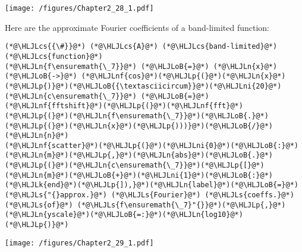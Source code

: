 \documentclass[12pt,a4paper]{article}
\newcommand{\HLJLk}[1]{\textcolor[RGB]{148,91,176}{\textbf{#1}}}
\newcommand{\HLJLn}[1]{#1}
\newcommand{\HLJLnf}[1]{\textcolor[RGB]{66,102,213}{#1}}
\newcommand{\HLJLs}[1]{\textcolor[RGB]{201,61,57}{#1}}
\newcommand{\HLJLni}[1]{\textcolor[RGB]{59,151,46}{#1}}
\newcommand{\HLJLoB}[1]{\textcolor[RGB]{102,102,102}{\textbf{#1}}}
\newcommand{\HLJLp}[1]{#1}
\newcommand{\HLJLcs}[1]{\textcolor[RGB]{153,153,119}{\textit{#1}}}
\begin{document}
\texttt{[image: /figures/Chapter2\_28\_1.pdf]}

Here are the approximate Fourier coefficients of a band-limited function:


\begin{lstlisting}
(*@\HLJLcs{{\#}}@*) (*@\HLJLcs{A}@*) (*@\HLJLcs{band-limited}@*) (*@\HLJLcs{function}@*)
(*@\HLJLn{f\ensuremath{\_7}}@*) (*@\HLJLoB{=}@*) (*@\HLJLn{x}@*) (*@\HLJLoB{->}@*) (*@\HLJLnf{cos}@*)(*@\HLJLp{(}@*)(*@\HLJLn{x}@*)(*@\HLJLp{)}@*)(*@\HLJLoB{{\textasciicircum}}@*)(*@\HLJLni{20}@*)
(*@\HLJLn{c\ensuremath{\_7}}@*) (*@\HLJLoB{=}@*) (*@\HLJLnf{fftshift}@*)(*@\HLJLp{(}@*)(*@\HLJLnf{fft}@*)(*@\HLJLp{(}@*)(*@\HLJLn{f\ensuremath{\_7}}@*)(*@\HLJLoB{.}@*)(*@\HLJLp{(}@*)(*@\HLJLn{x}@*)(*@\HLJLp{)))}@*)(*@\HLJLoB{/}@*)(*@\HLJLn{n}@*)
(*@\HLJLnf{scatter}@*)(*@\HLJLp{(}@*)(*@\HLJLni{0}@*)(*@\HLJLoB{:}@*)(*@\HLJLn{m}@*)(*@\HLJLp{,}@*)(*@\HLJLn{abs}@*)(*@\HLJLoB{.}@*)(*@\HLJLp{(}@*)(*@\HLJLn{c\ensuremath{\_7}}@*)(*@\HLJLp{[}@*)(*@\HLJLn{m}@*)(*@\HLJLoB{+}@*)(*@\HLJLni{1}@*)(*@\HLJLoB{:}@*)(*@\HLJLk{end}@*)(*@\HLJLp{]),}@*)(*@\HLJLn{label}@*)(*@\HLJLoB{=}@*)(*@\HLJLs{"{}approx.}@*) (*@\HLJLs{Fourier}@*) (*@\HLJLs{coeffs.}@*) (*@\HLJLs{of}@*) (*@\HLJLs{f\ensuremath{\_7}"{}}@*)(*@\HLJLp{,}@*)(*@\HLJLn{yscale}@*)(*@\HLJLoB{=:}@*)(*@\HLJLn{log10}@*)(*@\HLJLp{)}@*)
\end{lstlisting}

\texttt{[image: /figures/Chapter2\_29\_1.pdf]}
\end{document}
